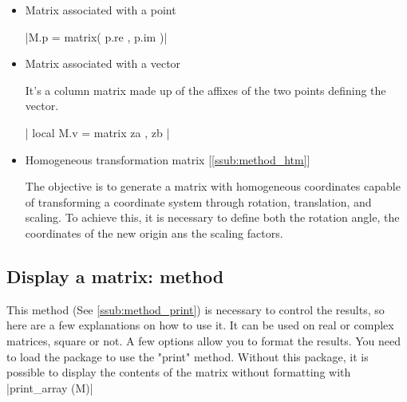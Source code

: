 \begin{itemize}
\begin{tkzexample}[latex=.5\textwidth]
\end{tkzexample}


\item Matrix associated with a point

  |M.p = matrix({ { p.re }, { p.im } })|

\item Matrix associated with a vector

It's a column matrix made up of the affixes of the two points defining the vector.

| local M.v = matrix{ { za }, { zb } }|

\begin{tkzexample}[latex=.5\textwidth]
\end{tkzexample}



\item  Homogeneous transformation matrix [\ref{ssub:method_htm}]

  The objective is to generate a matrix with homogeneous coordinates capable of transforming a coordinate system through rotation, translation, and scaling. To achieve this, it is necessary to define both the rotation angle, the coordinates of the new origin ans the scaling factors.

\begin{tkzexample}[latex=.35\textwidth]
\end{tkzexample}

\end{itemize}


\subsection{Display a matrix: method } %
\label{sub:display_a_matrix_method_print}


This method (See  \ref{ssub:method_print}) is necessary to control the results, so here are a few explanations on how to use it. It can be used on real or complex matrices, square or not. A few options allow you to format the results. You need to load the  package to use the "print" method. Without this package, it is possible to display the contents of the matrix without formatting with |print_array (M)|

